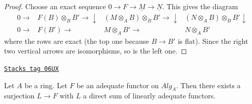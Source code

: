 \begin{proof}
Choose an exact sequence $0 \to F \to \underline{M} \to \underline{N}$.
This gives the diagram
$$
\begin{array}{cccc}0 \longrightarrow & F(B) \otimes_B B' \longrightarrow\downarrow & (M \otimes_A B)\otimes_B B' \longrightarrow\downarrow & (N \otimes_A B)\otimes_B B' \downarrow \\ 0 \longrightarrow & F(B') \longrightarrow & M \otimes_A B' \longrightarrow & N \otimes_A B'\end{array}
$$
where the rows are exact (the top one because $B \to B'$ is flat).
Since the right two vertical arrows are isomorphisms, so is the
left one.
\end{proof}

\begin{lemma}
\label{adequate-lemma-adequate-surjection-from-linear}
\href{https://stacks.math.columbia.edu/tag/06UX}{\texttt{Stacks tag 06UX}}

Let $A$ be a ring.
Let $F$ be an adequate functor on $\textit{Alg}_A$. Then there exists a
surjection $L \to F$ with $L$ a direct sum of linearly adequate functors.
\end{lemma}


